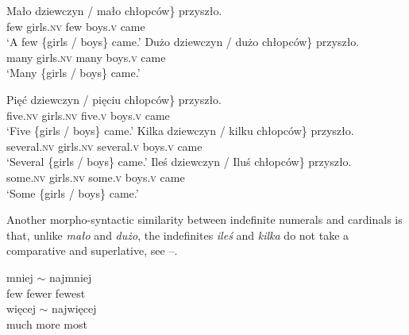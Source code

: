 \documentclass[output=paper,
]{langscibook}
\begin{document}
	\ea \label{ex:gender-agreement-quantifiers} \ea \gll \minsp{\{} Mało dziewczyn / mało chłopców\} przyszło.\\
	{} few girls.\textsc{nv} {} few boys.\textsc{v} came\\
	\glt `A few \{girls / boys\} came.'
	\ex \gll \minsp{\{} Dużo dziewczyn / dużo chłopców\} przyszło.\\
	{} many girls.\textsc{nv} {} many boys.\textsc{v} came\\
	\glt `Many \{girls / boys\} came.'
    \z
    \z

	\ea \label{ex:gender-agreement-cardinals} \ea \gll \minsp{\{} Pięć dziewczyn / pięciu chłopców\} przyszło.\\
	{} five.\textsc{nv} girls.\textsc{nv} {} five.\textsc{v} boys.\textsc{v} came\\ 
	\glt `Five \{girls / boys\} came.'
	\ex \gll \minsp{\{} Kilka dziewczyn / kilku chłopców\} przyszło.\\
	{} several.\textsc{nv} girls.\textsc{nv} {} several.\textsc{v} boys.\textsc{v} came\\
	\glt `Several \{girls / boys\} came.'
	\ex \gll \minsp{\{} Ileś dziewczyn / Iluś chłopców\} przyszło.\\
	{} some.\textsc{nv} girls.\textsc{nv} {} some.\textsc{v} boys.\textsc{v} came\\
	\glt `Some \{girls / boys\} came.'
	\z
    \z
    
	\noindent Another morpho-syntactic similarity between indefinite numerals and cardinals is that, unlike \textit{mało} and \textit{dużo}, the indefinites \textit{ileś} and \textit{kilka} do not take a comparative and superlative, see --.
	
	\ea \label{ex:comparison-quantifiers} \ea {} {mniej $\sim$} najmniej\\
	few fewer fewest\\ 
	\ex {} {więcej $\sim$} najwięcej\\
	much more most\\
	\z
    \z
    
\end{document}

